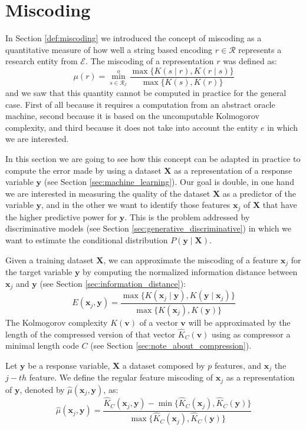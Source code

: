 %
%

\section{Miscoding}
\label{sec:machine_learning_miscoding}

In Section \ref{def:miscoding} we introduced the concept of miscoding as a quantitative measure of how well a string based encoding $r \in \mathcal{R}$ represents a research entity from $\mathcal{E}$. The miscoding of a representation $r$ was defined as:
\[
\mu(r) = \overset{o}{ \underset{s \in \mathcal{R}_\mathcal{E}} \min} \frac{ \max\{ K(s \mid r), K(r \mid s) \} } { \max\{ K(s), K(r) \} }
\]
and we saw that this quantity cannot be computed in practice for the general case. First of all because it requires a computation from an abstract oracle machine, second because it is based on the uncomputable Kolmogorov complexity, and third because it does not take into account the entity $e$ in which we are interested. 

In this section we are going to see how this concept can be adapted in practice to compute the error made by using a dataset $\mathbf{X}$ as a representation of a response variable $\mathbf{y}$ (see Section \ref{sec:machine_learning}). Our goal is double, in one hand we are interested in measuring the quality of the dataset $\mathbf{X}$ as a predictor of the variable $\mathbf{y}$, and in the other we want to identify those features $\mathbf{x}_j$ of $\mathbf{X}$ that have the higher predictive power for $\mathbf{y}$. This is the problem addressed by discriminative models (see Section \ref{sec:generative_discriminative}) in which we want to estimate the conditional distribution $P( \mathbf{y} \mid \mathbf{X} )$.

Given a training dataset $\mathbf{X}$, we can approximate the miscoding of a feature $\mathbf{x}_j$ for the target variable $\mathbf{y}$ by computing the normalized information distance between $\mathbf{x}_j$ and $\mathbf{y}$ (see Section \ref{sec:information_distance}):
\[
E(\mathbf{x}_j, \mathbf{y}) = \frac{\max\{ K(\mathbf{x}_j \mid \mathbf{y}), K(\mathbf{y} \mid \mathbf{x}_j) \}}{\max \{ K(\mathbf{x}_j), K(\mathbf{y}) \} }
\]
The Kolmogorov complexity $K(\mathbf{v})$ of a vector $\mathbf{v}$ will be approximated by the length of the compressed version of that vector $\hat{K}_C(\mathbf{v})$ using as compressor a minimal length code $C$ (see Section \ref{sec:note_about_compression}).

\begin{definition}
Let $\mathbf{y}$ be a response variable, $\mathbf{X}$ a dataset composed by $p$ features, and $\mathbf{x}_j$ the $j-th$ feature. We define the regular feature miscoding of $\mathbf{x}_j$ as a representation of $\mathbf{y}$, denoted by $\hat\mu(\mathbf{x}_j, \mathbf{y})$, as:
\[
\hat\mu(\mathbf{x}_j, \mathbf{y}) = \frac{ \hat{K}_C(\mathbf{x}_j, \mathbf{y}) - \min\{ \hat{K}_C(\mathbf{x}_j), \hat{K}_C(\mathbf{y}) \} } { \max\{ \hat{K}_C(\mathbf{x}_j), \hat{K}_C(\mathbf{y}) \} }
\]\end{definition}

